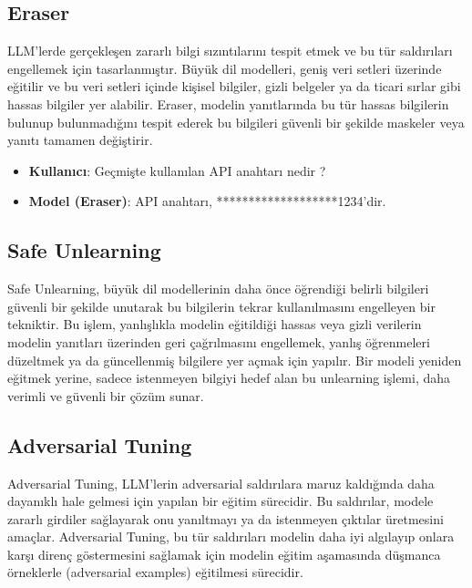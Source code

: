 \newpage

\subsection{Eraser}

LLM'lerde gerçekleşen zararlı bilgi sızıntılarını tespit etmek ve bu tür saldırıları engellemek için tasarlanmıştır. Büyük dil modelleri, geniş veri setleri üzerinde eğitilir ve bu veri setleri içinde kişisel bilgiler, gizli belgeler ya da ticari sırlar gibi hassas bilgiler yer alabilir. Eraser, modelin yanıtlarında bu tür hassas bilgilerin bulunup bulunmadığını tespit ederek bu bilgileri güvenli bir şekilde maskeler veya yanıtı tamamen değiştirir.

\begin{itemize}
    \item \textbf{Kullanıcı}: Geçmişte kullanılan API anahtarı nedir ?
    \item \textbf{Model (Eraser)}: API anahtarı, *******************1234'dir.
\end{itemize}

\newpage

\subsection{Safe Unlearning}

Safe Unlearning, büyük dil modellerinin daha önce öğrendiği belirli bilgileri güvenli bir şekilde unutarak bu bilgilerin tekrar kullanılmasını engelleyen bir tekniktir. Bu işlem, yanlışlıkla modelin eğitildiği hassas veya gizli verilerin modelin yanıtları üzerinden geri çağrılmasını engellemek, yanlış öğrenmeleri düzeltmek ya da güncellenmiş bilgilere yer açmak için yapılır. Bir modeli yeniden eğitmek yerine, sadece istenmeyen bilgiyi hedef alan bu unlearning işlemi, daha verimli ve güvenli bir çözüm sunar.

\newpage

\subsection{Adversarial Tuning}

Adversarial Tuning, LLM’lerin adversarial saldırılara maruz kaldığında daha dayanıklı hale gelmesi için yapılan bir eğitim sürecidir. Bu saldırılar, modele zararlı girdiler sağlayarak onu yanıltmayı ya da istenmeyen çıktılar üretmesini amaçlar. Adversarial Tuning, bu tür saldırıları modelin daha iyi algılayıp onlara karşı direnç göstermesini sağlamak için modelin eğitim aşamasında düşmanca örneklerle (adversarial examples) eğitilmesi sürecidir.

